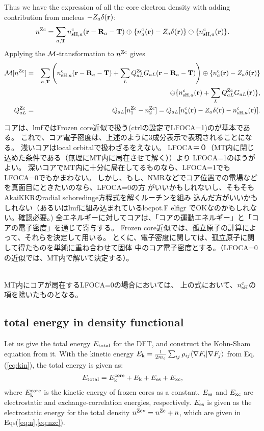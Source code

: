\documentclass[twocolumn,showpacs,preprintnumbers,amsmath,amssymb,floatfix]{revtex4-1}
\newcommand{\bfr}{{\bf r}}
\newcommand{\bfT}{{\bf T}}
\newcommand{\bfR}{{\bf R}}
\newcommand{\ooplus}{\oplus}
\newcommand{\oominus}{\ominus}
\def\nc{n^{\rm c}}
\def\nzc{n^{\rm Zc}}
\def\nzcv{n^{\rm Zcv}}
\def\MM{{\cal M}}
\def\rhoij{\rho_{ij}}
\def\ekcore{E_{\rm k}^{\rm core}}
\def\ek{E_{\rm k}}
\begin{document}
\begin{widetext}
Thus we have the expression of all the core electron density with adding
contribution from nucleus $-Z_a\delta(\bfr)$:
\begin{eqnarray}
\nzc = \sum_{a,\bfT} \nc_{{\rm sH},a}(\bfr-\bfR_a-\bfT) \ooplus
\{\nc_{a}(\bfr)-Z_a\delta(\bfr) \} \oominus \{\nc_{{\rm sH},a}(\bfr) \}.
\label{eq:nzc}
\end{eqnarray}
Applying the $\MM$-transformation to $\nzc$ gives
\begin{eqnarray}
\MM[\nzc]
&=& \sum_{a,\bfT} 
\left( \nc_{{\rm sH},a}(\bfr-\bfR_a-\bfT)+\sum_L Q_{aL}^{\rm Zc} G_{aL}(\bfr-\bfR_a-\bfT) \right)\ooplus
\{\nc_{a}(\bfr)-Z_a\delta(\bfr)\} \nonumber \\
&& \oominus \{ \nc_{{\rm sH},a}(\bfr)+\sum_L Q_{aL}^{\rm Zc}G_{aL}(\bfr)\},\label{eq:nc} \\
Q^{\rm Zc}_{aL} &=& Q_{aL}[\nzc_1-\nzc_2] =
Q_{aL}[\nc_{a}(\bfr)-Z_a\delta(\bfr)-\nc_{{\rm sH},a}(\bfr)] \label{eq:qalnzc}.
\end{eqnarray}


コアは、lmfではFrozen core近似で扱う(ctrlの設定でLFOCA=1)のが基本である。
これで、コア電子密度は、上述のように3成分表示で表現されることになる。
浅いコアはlocal orbitalで扱わざるをえない。
LFOCA＝０（MT内に閉じ込めた条件である（無理にMT内に局在させて解く））より
LFOCA=1のほうがよい。
深いコアでMT内に十分に局在してるものなら、LFOCA=1でもLFOCA=0でもかまわない。
しかし、もし、NMRなどでコア位置での電場などを真面目にときたいのなら、LFOCA=0の方
がいいかもしれないし、そもそもAkaiKKRのradial schoredinge方程式を解くルーチンを組み
込んだ方がいいかもしれない（あるいはlmfに組み込まれているlocpot.F elfigr
でOKなのかもしれない。確認必要。)
全エネルギーに対してコアは、「コアの運動エネルギー」と「コアの電子密度」を通じて寄与する。
Frozen core近似では、孤立原子の計算によって、それらを決定して用いる。
とくに、電子密度に関しては、孤立原子に関して得たものを単純に重ね合わせて固体
中のコア電子密度とする。（LFOCA=0の近似では、MT内で解いて決定する）。

\ \\

MT内にコアが局在するLFOCA=0の場合においては、
上の式において、$n^{\rm c}_{\rm sH}$の項を除いたものとなる。

\subsection{total energy in density functional}
\label{sec:total} Let us give the total energy $E_{\rm total}$ for the
DFT, and construct the Kohn-Sham equation from it. With the kinetic
energy $\ek=\frac{1}{2m_e} \sum_{ij} \rhoij \langle \nabla F_i| \nabla
F_{j} \rangle$ from Eq.(\ref{eq:kin}), the total energy is given as:
\begin{eqnarray}
E_{\rm total}=\ekcore+ \ek+E_{\rm es}+E_{\rm xc},
\label{eq:etot}
\end{eqnarray} 
where $\ekcore$ is the kinetic energy of frozen cores as a constant.
$E_{\rm es}$ and $E_{\rm xc}$ are electrostatic and exchange-correlation
energies, respectively.
$E_{\rm es}$ is given as the electrostatic energy for the
total density $\nzcv =\nzc +n $, which are given in
Eqs(\ref{eq:n},\ref{eq:nzc}). 


\end{widetext}
\end{document}
